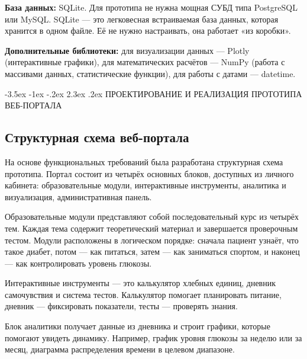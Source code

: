 \documentclass[14pt, a4paper]{extarticle}
\makeatletter
\renewcommand\section{\@startsection {section}{1}{\z@}%
{-3.5ex \@plus -1ex \@minus -.2ex}%
{2.3ex \@plus.2ex}%
{\centering\normalfont\Large\bfseries}}
\makeatother
\begin{document}
\vskip 5cm
\noindent \textbf{База данных:} SQLite. Для прототипа не нужна мощная СУБД типа PostgreSQL или MySQL. SQLite — это легковесная встраиваемая база данных, которая хранится в одном файле. Её не нужно настраивать, она работает «из коробки».

\medskip
\noindent \textbf{Дополнительные библиотеки:} для визуализации данных — Plotly (интерактивные графики), для математических расчётов — NumPy (работа с массивами данных, статистические функции), для работы с датами — datetime.

\newpage
\section{ПРОЕКТИРОВАНИЕ И РЕАЛИЗАЦИЯ ПРОТОТИПА ВЕБ-ПОРТАЛА}

\subsection{Структурная схема веб-портала}

\noindent На основе функциональных требований была разработана структурная схема прототипа. Портал состоит из четырёх основных блоков, доступных из личного кабинета: образовательные модули, интерактивные инструменты, аналитика и визуализация, административная панель.

\medskip
\noindent Образовательные модули представляют собой последовательный курс из четырёх тем. Каждая тема содержит теоретический материал и завершается проверочным тестом. Модули расположены в логическом порядке: сначала пациент узнаёт, что такое диабет, потом — как питаться, затем — как заниматься спортом, и наконец — как контролировать уровень глюкозы.

\medskip
\noindent Интерактивные инструменты — это калькулятор хлебных единиц, дневник самочувствия и система тестов. Калькулятор помогает планировать питание, дневник — фиксировать показатели, тесты — проверять знания.

\medskip
\noindent Блок аналитики получает данные из дневника и строит графики, которые помогают увидеть динамику. Например, график уровня глюкозы за неделю или за месяц, диаграмма распределения времени в целевом диапазоне.
\end{document}
